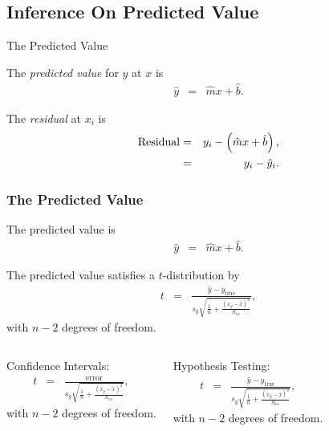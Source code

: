 \subsection{Inference On Predicted Value}

\begin{frame}{The Predicted Value}

  \begin{definition}
    The \textit{predicted value} for $y$ at $x$ is
    \begin{eqnarray*}
      \hat{y} & = & \hat{m} x + \hat{b}.
    \end{eqnarray*}

    The \textit{residual} at $x_i$ is 
    \begin{eqnarray*}
      \mathrm{Residual} & = & y_i - \left( \hat{m} x + \hat{b} \right), \\
      & = & y_i - \hat{y}_i.
    \end{eqnarray*}

  \end{definition}

  
\end{frame}

\begin{frame}
  \frametitle{The Predicted Value}

  The predicted value is 
  \begin{eqnarray*}
    \hat{y} & = & \hat{m} x + \hat{b}.
  \end{eqnarray*}


  The predicted value  satisfies a $t$-distribution by
  \begin{eqnarray*}
    t & = & \frac{\hat{y}-y_{\mathrm{true}}}{s_y \sqrt{\frac{1}{n}+\frac{(x_y-\bar{x})^2}{S_{xx}}}},
  \end{eqnarray*}
  with $n-2$ degrees of freedom.

  {

    \begin{columns}

      Confidence Intervals:
      \begin{eqnarray*}
        t & = & \frac{\mathrm{error}}{s_y \sqrt{\frac{1}{n}+\frac{(x_y-\bar{x})^2}{S_{xx}}}},
      \end{eqnarray*}
      with $n-2$ degrees of freedom.


      Hypothesis Testing:
      \begin{eqnarray*}
        t & = & \frac{\hat{y}-y_{\mathrm{true}}}{s_y \sqrt{\frac{1}{n}+\frac{(x_y-\bar{x})^2}{S_{xx}}}},
      \end{eqnarray*}
      with $n-2$ degrees of freedom.

    
    \end{columns}
  }


\end{frame}


